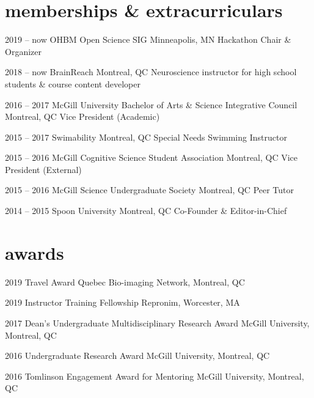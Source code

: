 \documentclass[]{friggeri-cv} %
\begin{document}
\section{memberships \& extracurriculars}

\begin{entrylist}
\entry
{2019 -- now}
{OHBM Open Science SIG}
{Minneapolis, MN}
{Hackathon Chair \& Organizer}

\entry
{2018 -- now}
{BrainReach}
{Montreal, QC}
{Neuroscience instructor for high school students \& course content developer}

\entry
{2016 -- 2017}
{McGill University Bachelor of Arts \& Science Integrative Council}
{Montreal, QC}
{Vice President (Academic)}

\entry
{2015 -- 2017}
{Swimability}
{Montreal, QC}
{Special Needs Swimming Instructor}

\entry
{2015 -- 2016}
{McGill Cognitive Science Student Association}
{Montreal, QC}
{Vice President (External)}
 
\entry
{2015 -- 2016}
{McGill Science Undergraduate Society}
{Montreal, QC}
{Peer Tutor}

\entry
{2014 -- 2015}
{Spoon University}
{Montreal, QC}
{Co-Founder \& Editor-in-Chief}
\end{entrylist}

\newpage

\section{awards}

\begin{entrylist}
\vspace{-7pt}

\entry
{2019}
{Travel Award}
{Quebec Bio-imaging Network, Montreal, QC}
{}
\vspace{-7pt}

\entry
{2019}
{Instructor Training Fellowship}
{Repronim, Worcester, MA}
{}
\vspace{-7pt}

\entry
{2017}
{Dean's Undergraduate Multidisciplinary Research Award}
{McGill University, Montreal, QC}
{}
\vspace{-7pt}

\entry
{2016}
{Undergraduate Research Award}
{McGill University, Montreal, QC}
{}
\vspace{-7pt}

\entry
{2016}
{Tomlinson Engagement Award for Mentoring}
{McGill University, Montreal, QC}
{}
\vspace{-7pt}

\end{entrylist}
\end{document}
